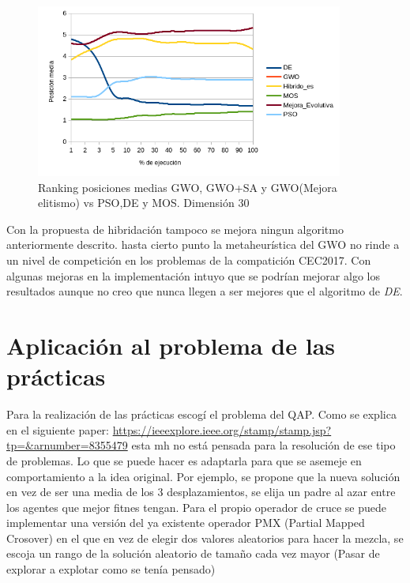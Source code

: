 \documentclass[a4paper]{report}
\begin{document}
\begin{figure}[H]
    \centering
    \caption{Ranking posiciones medias GWO, GWO+SA y GWO(Mejora elitismo) vs PSO,DE y MOS. Dimensión 30}
    \includegraphics[width=0.9\textwidth]{Resultados/Analisis_final/D30/Todos/Grafico_puestos.png}

\end{figure}

Con la propuesta de hibridación tampoco se mejora ningun algoritmo anteriormente descrito. hasta cierto punto la metaheurística del GWO no rinde a un nivel de competición en los problemas de la compatición CEC2017. Con algunas mejoras en la implementación intuyo que se podrían mejorar algo los resultados aunque no creo que nunca llegen a ser mejores que el algoritmo de \textit{DE}.



\section{Aplicación al problema de las prácticas}

Para la realización de las prácticas escogí el problema del QAP. Como se explica en el siguiente paper: \url{https://ieeexplore.ieee.org/stamp/stamp.jsp?tp=&arnumber=8355479} esta mh no está pensada para la resolución de ese tipo de problemas. Lo que se puede hacer es adaptarla para que se asemeje en comportamiento a la idea original. Por ejemplo, se propone que la nueva solución en vez de ser una media de los 3 desplazamientos, se elija un padre al azar entre los agentes que mejor fitnes tengan. Para el propio operador de cruce se puede implementar una versión del ya existente operador PMX (Partial Mapped Crosover) en el que en vez de elegir dos valores aleatorios para hacer la mezcla, se escoja un rango de la solución aleatorio de tamaño cada vez mayor (Pasar de explorar a explotar como se tenía pensado)
\end{document}
